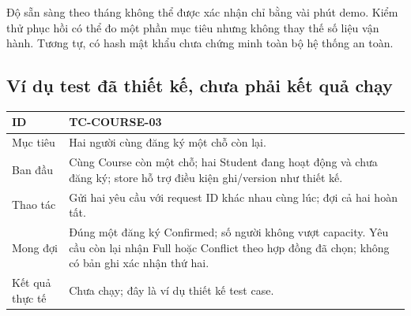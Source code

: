 Độ sẵn sàng theo tháng không thể được xác nhận chỉ bằng vài phút demo. Kiểm thử phục hồi có thể đo một phần mục tiêu nhưng không thay thế số liệu vận hành. Tương tự, có hash mật khẩu chưa chứng minh toàn bộ hệ thống an toàn.

\clearpage
\subsection{Ví dụ test đã thiết kế, chưa phải kết quả chạy}
\begin{longtable}{|L{25mm}|L{117mm}|}\hline
ID & TC-COURSE-03\\\hline
Mục tiêu & Hai người cùng đăng ký một chỗ còn lại.\\\hline
Ban đầu & Cùng Course còn một chỗ; hai Student đang hoạt động và chưa đăng ký; store hỗ trợ điều kiện ghi/version như thiết kế.\\\hline
Thao tác & Gửi hai yêu cầu với request ID khác nhau cùng lúc; đợi cả hai hoàn tất.\\\hline
Mong đợi & Đúng một đăng ký Confirmed; số người không vượt capacity. Yêu cầu còn lại nhận Full hoặc Conflict theo hợp đồng đã chọn; không có bản ghi xác nhận thứ hai.\\\hline
Kết quả thực tế & Chưa chạy; đây là ví dụ thiết kế test case.\\\hline
\end{longtable}
